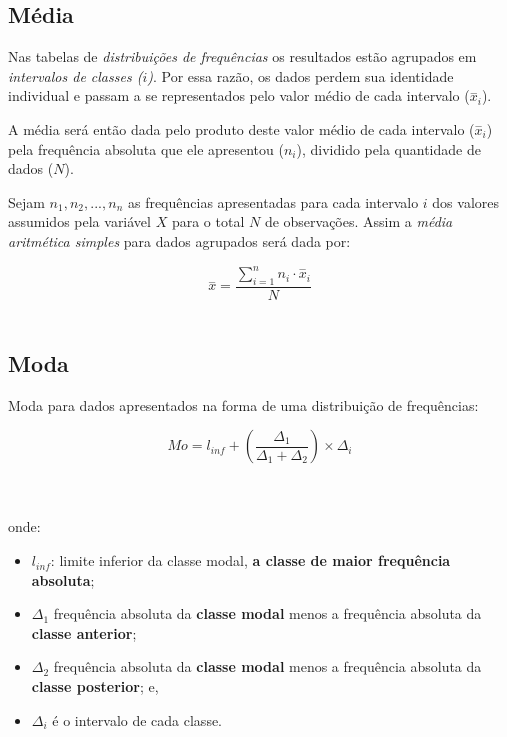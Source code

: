 \documentclass[
]{book}
\providecommand{\tightlist}{%
  \setlength{\itemsep}{0pt}\setlength{\parskip}{0pt}}
\begin{document}
\hfill\break

\hypertarget{muxe9dia-1}{%
\subsection{Média}\label{muxe9dia-1}}

\hfill\break

Nas tabelas de \emph{distribuições de frequências} os resultados estão agrupados em \emph{intervalos de classes (\(i\))}. Por essa razão, os dados perdem sua identidade individual e passam a se representados pelo valor médio de cada intervalo (\(\stackrel{-}{x}_{i}\)).

\hfill\break

A média será então dada pelo produto deste valor médio de cada intervalo (\(\stackrel{-}{x}_{i}\)) pela frequência absoluta que ele apresentou (\({n}_{i}\)), dividido pela quantidade de dados (\(N\)).

\hfill\break

Sejam \(n_{1}, n_{2}, ..., n_{n}\) as frequências apresentadas para cada intervalo \(i\) dos valores assumidos pela variável \(X\) para o total \(N\) de observações. Assim a \emph{média aritmética simples} para dados agrupados será dada por:

\hfill\break

\[
\stackrel{-}{x}=\frac{\sum _{i=1}^{n}{n}_{i}\cdot{\stackrel{-}{x}}_{i}}{N}
\]\\

\hypertarget{moda-1}{%
\subsection{Moda}\label{moda-1}}

\hfill\break

Moda para dados apresentados na forma de uma distribuição de frequências:

\[
Mo = l_{inf} + (\frac{\Delta_{1}}{\Delta_{1} + \Delta_{2}}) \times \Delta_{i}
\]\\
\strut \\

onde:

\begin{itemize}
\tightlist
\item
  \(l_{inf}\): limite inferior da classe modal, \textbf{a classe de maior frequência absoluta};
\item
  \(\Delta_{1}\) frequência absoluta da \textbf{classe modal} menos a frequência absoluta da \textbf{classe anterior};
\item
  \(\Delta_{2}\) frequência absoluta da \textbf{classe modal} menos a frequência absoluta da \textbf{classe posterior}; e,
\item
  \(\Delta_{i}\) é o intervalo de cada classe.
\end{itemize}
\end{document}
